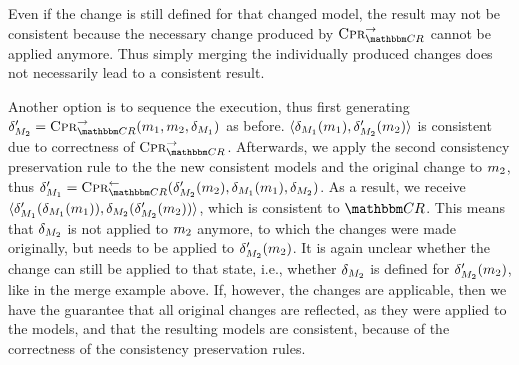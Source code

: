 Even if the change is still defined for that changed model, the result may not be consistent because the necessary change produced by $\consistencypreservationrule{\consistencyrelationset{CR}}^{\rightarrow}$ cannot be applied anymore.
Thus simply merging the individually produced changes does not necessarily lead to a consistent result.

Another option is to sequence the execution, thus first generating $\change{\metamodel{M}{2}}' = \consistencypreservationrule{\consistencyrelationset{CR}}^{\rightarrow}(\model{m}{1},\model{m}{2}, \change{\metamodel{M}{1}})$ as before.
$\tupled{\change{\metamodel{M}{1}}(\model{m}{1}), \change{\metamodel{M}{2}}'(\model{m}{2})}$ is consistent due to correctness of $\consistencypreservationrule{\consistencyrelationset{CR}}^{\rightarrow}$.
Afterwards, we apply the second consistency preservation rule to the the new consistent models and the original change to $\model{m}{2}$, thus $\change{\metamodel{M}{1}}' = \consistencypreservationrule{\consistencyrelationset{CR}}^{\leftarrow}(\change{\metamodel{M}{2}}'(\model{m}{2}), \change{\metamodel{M}{1}}(\model{m}{1}), \change{\metamodel{M}{2}})$.
As a result, we receive $\tupled{\change{\metamodel{M}{1}}'(\change{\metamodel{M}{1}}(\model{m}{1})), \change{\metamodel{M}{2}}(\change{\metamodel{M}{2}}'(\model{m}{2}))}$, which is consistent to $\consistencyrelationset{CR}$.
This means that $\change{\metamodel{M}{2}}$ is not applied to $\model{m}{2}$ anymore, to which the changes were made originally, but needs to be applied to $\change{\metamodel{M}{2}}'(\model{m}{2})$.
It is again unclear whether the change can still be applied to that state, i.e., whether $\change{\metamodel{M}{2}}$ is defined for $\change{\metamodel{M}{2}}'(\model{m}{2})$, like in the merge example above.
If, however, the changes are applicable, then we have the guarantee that all original changes are reflected, as they were applied to the models, and that the resulting models are consistent, because of the correctness of the consistency preservation rules.

